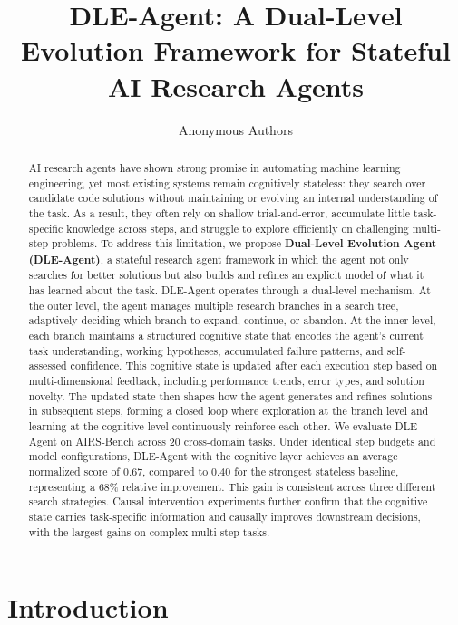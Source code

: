 \documentclass{article} %
\title{DLE-Agent: A Dual-Level Evolution Framework for Stateful AI Research Agents}
\author{Anonymous Authors}
\begin{document}
\ifcolmsubmission
\linenumbers
\fi

\maketitle

\begin{abstract}
AI research agents have shown strong promise in automating machine learning
engineering, yet most existing systems remain cognitively stateless: they search
over candidate code solutions without maintaining or evolving an internal
understanding of the task. As a result, they often rely on shallow
trial-and-error, accumulate little task-specific knowledge across steps, and
struggle to explore efficiently on challenging multi-step problems. To address
this limitation, we propose \textbf{Dual-Level Evolution Agent (DLE-Agent)}, a
stateful research agent framework in which the agent not only searches for
better solutions but also builds and refines an explicit model of what it has
learned about the task. DLE-Agent operates through a dual-level mechanism. At
the outer level, the agent manages multiple research branches in a search tree,
adaptively deciding which branch to expand, continue, or abandon. At the inner
level, each branch maintains a structured cognitive state that encodes the
agent's current task understanding, working hypotheses, accumulated failure
patterns, and self-assessed confidence. This cognitive state is updated after
each execution step based on multi-dimensional feedback, including performance
trends, error types, and solution novelty. The updated state then shapes how
the agent generates and refines solutions in subsequent steps, forming a closed
loop where exploration at the branch level and learning at the cognitive level
continuously reinforce each other. We evaluate DLE-Agent on AIRS-Bench across
20 cross-domain tasks. Under identical step budgets and model configurations,
DLE-Agent with the cognitive layer achieves an average normalized score of
0.67, compared to 0.40 for the strongest stateless baseline, representing a
68\% relative improvement. This gain is consistent across three different
search strategies. Causal intervention experiments further confirm that the
cognitive state carries task-specific information and causally improves
downstream decisions, with the largest gains on complex multi-step tasks.
\end{abstract}
 


\section{Introduction}
\label{sec:intro}
\end{document}
